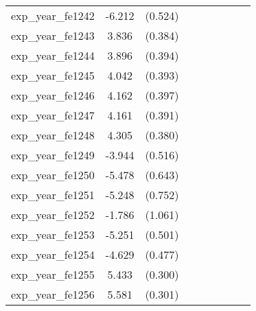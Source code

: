 {\begin{tabular}{l*{4}{cc}}
exp\_year\_fe1242&   -6.212\sym{***}&  (0.524)&                  &         &                  &         &                  &         \\
exp\_year\_fe1243&    3.836\sym{***}&  (0.384)&                  &         &                  &         &                  &         \\
exp\_year\_fe1244&    3.896\sym{***}&  (0.394)&                  &         &                  &         &                  &         \\
exp\_year\_fe1245&    4.042\sym{***}&  (0.393)&                  &         &                  &         &                  &         \\
exp\_year\_fe1246&    4.162\sym{***}&  (0.397)&                  &         &                  &         &                  &         \\
exp\_year\_fe1247&    4.161\sym{***}&  (0.391)&                  &         &                  &         &                  &         \\
exp\_year\_fe1248&    4.305\sym{***}&  (0.380)&                  &         &                  &         &                  &         \\
exp\_year\_fe1249&   -3.944\sym{***}&  (0.516)&                  &         &                  &         &                  &         \\
exp\_year\_fe1250&   -5.478\sym{***}&  (0.643)&                  &         &                  &         &                  &         \\
exp\_year\_fe1251&   -5.248\sym{***}&  (0.752)&                  &         &                  &         &                  &         \\
exp\_year\_fe1252&   -1.786         &  (1.061)&                  &         &                  &         &                  &         \\
exp\_year\_fe1253&   -5.251\sym{***}&  (0.501)&                  &         &                  &         &                  &         \\
exp\_year\_fe1254&   -4.629\sym{***}&  (0.477)&                  &         &                  &         &                  &         \\
exp\_year\_fe1255&    5.433\sym{***}&  (0.300)&                  &         &                  &         &                  &         \\
exp\_year\_fe1256&    5.581\sym{***}&  (0.301)&                  &         &                  &         &                  &         \\

\end{tabular}}
